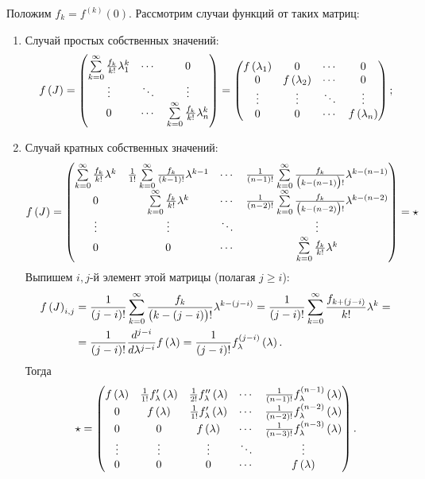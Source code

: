 	Положим $f_k = f^{(k)}(0)$. Рассмотрим случаи функций от таких матриц:
	\begin{enumerate}
		\item Случай простых собственных значений:
		\[ 
			f\left( J \right) = \begin{pmatrix} 
				\sum\limits_{k = 0}^{\infty} \frac{f_k}{k!} \lambda_1^k & \cdots & 0 \\ 
				\vdots & \ddots & \vdots \\ 
				0 & \cdots & \sum\limits_{k = 0}^{\infty} \frac{f_k}{k!} \lambda_n^k 
			\end{pmatrix} = \begin{pmatrix} 
				f\left( \lambda_1 \right) & 0 & \cdots & 0 \\ 
				0 & f\left( \lambda_2 \right) & \cdots & 0 \\ 
				\vdots & \vdots & \ddots & \vdots \\ 
				0 & 0 & \cdots & f\left( \lambda_n \right) 
			\end{pmatrix}; \]
		\item Случай кратных собственных значений:
		\[ 
			f \left( J \right) = \begin{pmatrix} 
				\sum\limits_{k = 0}^{\infty} \frac{f_k}{k!} \lambda^k & \frac{1}{1!} \sum\limits_{k = 0}^{\infty} \frac{f_k}{(k-1)!} \lambda^{k-1} & \cdots & \frac{1}{(n-1)!} \sum\limits_{k = 0}^{\infty} \frac{f_k}{\bigl( k-(n-1) \bigr)!} \lambda^{k-(n-1)} \\ 
				0 & \sum\limits_{k = 0}^{\infty} \frac{f_k}{k!} \lambda^k & \cdots & \frac{1}{(n-2)!} \sum\limits_{k = 0}^{\infty} \frac{f_k}{\bigl( k-(n-2) \bigr)!} \lambda^{k-(n-2)} \\ 
				\vdots & \vdots & \ddots & \vdots \\
				0 & 0 & \cdots & \sum\limits_{k = 0}^{\infty} \frac{f_k}{k!} \lambda^k
			\end{pmatrix} = \star
		\]
		Выпишем $i, j$-й элемент этой матрицы (полагая $j \ge i$):
		\[ \begin{split} 
			f \left( J \right)_{i, j} &= \frac{1}{(j-i)!} \sum_{k = 0}^{\infty} \frac{f_k}{\bigl( k - (j-i) \bigr)!} \lambda^{k - (j-i)} = \frac{1}{(j-i)!} \sum_{k=0}^{\infty} \frac{f_{k+(j-i)}}{k!} \lambda^{k} = \\ 
			&= \frac{1}{(j-i)!} \frac{d^{j-i}}{d\lambda^{j-i}} f\left( \lambda \right) = \frac{1}{(j-i)!} f^{(j-i)}_{\lambda} \left( \lambda \right). 
		\end{split} \]
		Тогда
		\[ \star = \begin{pmatrix}
			f\left( \lambda \right) & \frac{1}{1!} f'_{\lambda} \left( \lambda \right) & \frac{1}{2!} f''_{\lambda} \left( \lambda \right) & \cdots & \frac{1}{(n-1)!} f^{(n-1)}_{\lambda} \left( \lambda \right) \\ 
			0 & f\left( \lambda \right) & \frac{1}{1!} f'_{\lambda} \left( \lambda \right) & \cdots & \frac{1}{(n-2)!} f^{(n-2)}_{\lambda} \left( \lambda \right) \\ 
			0 & 0 & f\left( \lambda \right) & \cdots & \frac{1}{(n-3)!} f^{(n-3)}_{\lambda} \left( \lambda \right) \\ 
			\vdots & \vdots & \vdots & \ddots & \vdots \\
			0 & 0 & 0 & \cdots & f\left( \lambda \right)
		\end{pmatrix}. \]


\end{enumerate}
